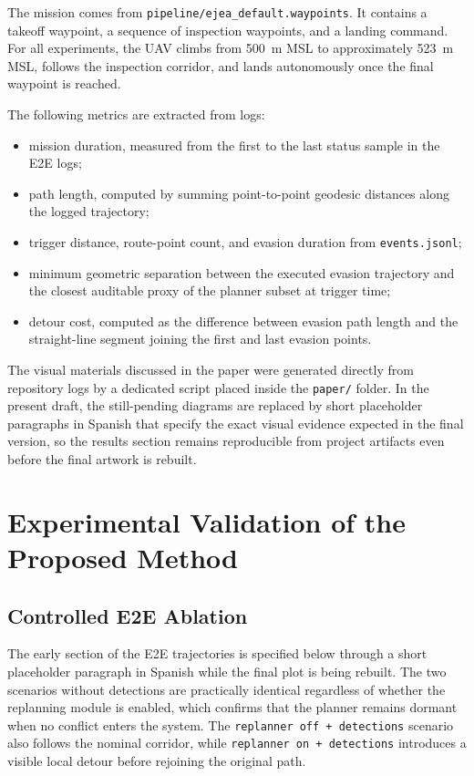 \documentclass[journal,twoside,web]{ieeecolor}
\begin{document}
The mission comes from \texttt{pipeline/ejea\_default.waypoints}. It contains a takeoff waypoint, a sequence of inspection waypoints, and a landing command. For all experiments, the UAV climbs from \SI{500}{\meter} MSL to approximately \SI{523}{\meter} MSL, follows the inspection corridor, and lands autonomously once the final waypoint is reached.

The following metrics are extracted from logs:
\begin{itemize}
    \item mission duration, measured from the first to the last status sample in the E2E logs;
    \item path length, computed by summing point-to-point geodesic distances along the logged trajectory;
    \item trigger distance, route-point count, and evasion duration from \texttt{events.jsonl};
    \item minimum geometric separation between the executed evasion trajectory and the closest auditable proxy of the planner subset at trigger time;
    \item detour cost, computed as the difference between evasion path length and the straight-line segment joining the first and last evasion points.
\end{itemize}

The visual materials discussed in the paper were generated directly from repository logs by a dedicated script placed inside the \texttt{paper/} folder. In the present draft, the still-pending diagrams are replaced by short placeholder paragraphs in Spanish that specify the exact visual evidence expected in the final version, so the results section remains reproducible from project artifacts even before the final artwork is rebuilt.

\section{Experimental Validation of the Proposed Method}

\subsection{Controlled E2E Ablation}

The early section of the E2E trajectories is specified below through a short placeholder paragraph in Spanish while the final plot is being rebuilt. The two scenarios without detections are practically identical regardless of whether the replanning module is enabled, which confirms that the planner remains dormant when no conflict enters the system. The \texttt{replanner off + detections} scenario also follows the nominal corridor, while \texttt{replanner on + detections} introduces a visible local detour before rejoining the original path.
\end{document}
